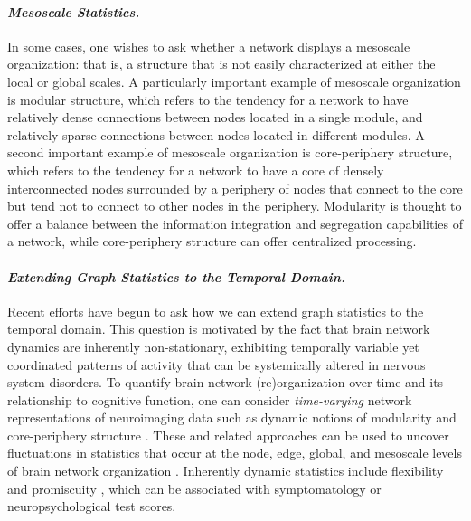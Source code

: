 \documentclass[12pt]{article}
\begin{document}
\paragraph{\emph{Mesoscale Statistics.}}

In some cases, one wishes to ask whether a network displays a mesoscale organization: that is, a structure that is not easily characterized at either the local or global scales. A particularly important example of mesoscale organization is modular structure, which refers to the tendency for a network to have relatively dense connections between nodes located in a single module, and relatively sparse connections between nodes located in different modules. A second important example of mesoscale organization is core-periphery structure, which refers to the tendency for a network to have a core of densely interconnected nodes surrounded by a periphery of nodes that connect to the core but tend not to connect to other nodes in the periphery. Modularity is thought to offer a balance between the information integration and segregation capabilities of a network, while core-periphery structure can offer centralized processing.

\paragraph{\emph{Extending Graph Statistics to the Temporal Domain.}}

Recent efforts have begun to ask how we can extend graph statistics to the temporal domain. This question is motivated by the fact that brain network dynamics are inherently non-stationary, exhibiting temporally variable yet coordinated patterns of activity \cite{Kopell2014,calhoun2014chronnectome} that can be systemically altered in nervous system disorders. To quantify brain network (re)organization over time and its relationship to cognitive function, one can consider \emph{time-varying} network representations of neuroimaging data such as dynamic notions of modularity \cite{bassett2013robust} and core-periphery structure \cite{bassett2013task}. These and related approaches can be used to uncover fluctuations in statistics that occur at the node, edge, global, and mesoscale levels of brain network organization \cite{betzel2016multi}. Inherently dynamic statistics include flexibility \cite{bassett2011dynamic,mattar2016flexible} and promiscuity \cite{papadopoulos2016evolution}, which can be associated with symptomatology or neuropsychological test scores.
\end{document}

